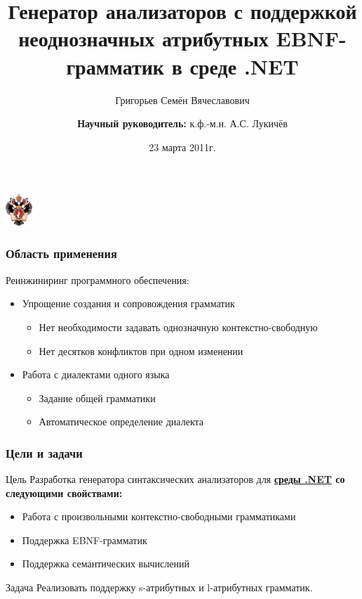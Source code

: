 \documentclass{beamer}
\title[]{Генератор анализаторов с поддержкой неоднозначных атрибутных EBNF-грамматик в среде .NET}
\institute[СПбГУ]{
Санкт-Петербургский государственный университет \\
Математико-Механический факультет \\
Кафедра системного программирования }
\author[Лукичёв А.С. Григорьев С.В.]{Григорьев Семён Вячеславович \\
  \and  
  {\bfseries Научный руководитель:} к.ф.-м.н. А.С. Лукичёв \\ 
}
\date{23 марта 2011г.}
\begin{document}
\sloppy
{

\begin{frame}
\begin{center}
{\includegraphics[width=1cm]{SPbGU_Logo.png}}
\end{center}
\titlepage
\end{frame}
}

\begin{frame}
	\transwipe[direction=90]
	\frametitle{Область применения}
Реинжиниринг программного обеспечения:
	\begin{itemize}
		\item Упрощение создания и сопровождения грамматик
			\begin{itemize}
				\item Нет необходимости задавать однозначную контекстно-свободную
				\item Нет десятков конфликтов при одном изменении
			\end{itemize}
		\item Работа с диалектами одного языка
			\begin{itemize}
				\item Задание общей грамматики
				\item Автоматическое определение диалекта
			\end{itemize}		
	\end{itemize}
\end{frame}


\begin{frame}
	\transwipe[direction=90]
	\frametitle{Цели и задачи}
    \begin{block}{Цель}
        Разработка генератора синтаксических анализаторов для \bfseries{\underline {среды .NET}} \normalfont со следующими свойствами:  
	    \begin{itemize}
		    \item Работа с произвольными контекстно-свободными грамматиками
		    \item Поддержка EBNF-грамматик
		    \item Поддержка семантических вычислений
	    \end{itemize}
    \end{block}
    \begin{block}{Задача}
        Реализовать поддержку s-атрибутных и l-атрибутных грамматик.
    \end{block}
\end{frame}
\end{document}
